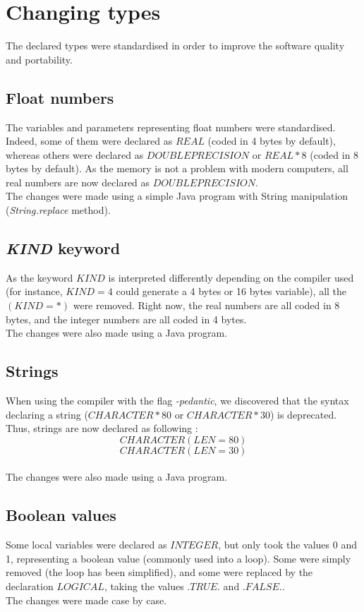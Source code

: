 \section{Changing types}
The declared types were standardised in order to improve the software quality and portability.

\subsection{Float numbers}
The variables and parameters representing float numbers were standardised. Indeed, some of them were declared as $REAL$ (coded in 4 bytes by default), whereas others were declared as $DOUBLE PRECISION$ or $REAL*8$ (coded in 8 bytes by default). As the memory is not a problem with modern computers, all real numbers are now declared as $DOUBLE PRECISION$.
\\The changes were made using a simple Java program with String manipulation (\textit{String.replace} method).

\subsection{\textit{KIND} keyword}
As the keyword $KIND$ is interpreted differently depending on the compiler used (for instance, $KIND=4$ could generate a 4 bytes or 16 bytes variable), all the $(KIND=*)$ were removed.
Right now, the real numbers are all coded in 8 bytes, and the integer numbers are all coded in 4 bytes.
\\The changes were also made using a Java program.

\subsection{Strings}
When using the compiler with the flag \textit{-pedantic}, we discovered that the syntax declaring a string ($CHARACTER*80$ or $CHARACTER*30$) is deprecated. Thus, strings are now declared as following : 
\[CHARACTER (LEN=80)\]
\[CHARACTER (LEN=30)\]
\\The changes were also made using a Java program.

\subsection{Boolean values}
Some local variables were declared as $INTEGER$, but only took the values 0 and 1, representing a boolean value (commonly used into a loop). Some were simply removed (the loop has been simplified), and some were replaced by the declaration $LOGICAL$, taking the values $.TRUE.$ and $.FALSE.$.
\\The changes were made case by case.


